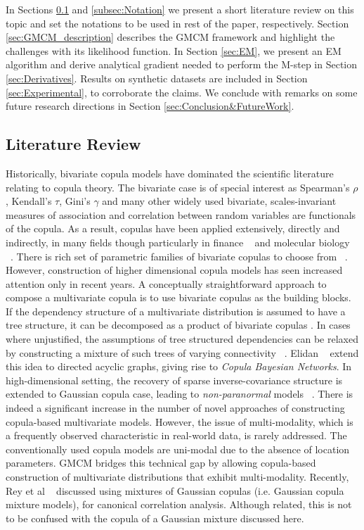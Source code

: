 \documentclass[]{article}
\begin{document}
In Sections \ref{subsec:LitReview} and \ref{subsec:Notation} we present a short literature review on this topic and set the notations to be used in rest of the paper, respectively. Section \ref{sec:GMCM_description} describes the GMCM framework and highlight the challenges with its likelihood function. In Section \ref{sec:EM}, we present an EM algorithm and derive analytical gradient needed to perform the M-step in Section \ref{sec:Derivatives}. Results on synthetic datasets are included in Section \ref{sec:Experimental}, to corroborate the claims. We conclude with remarks on some future research directions in Section \ref{sec:Conclusion&FutureWork}.


\subsection{Literature Review}\label{subsec:LitReview}
Historically, bivariate copula models have dominated the scientific literature relating to copula theory. The bivariate case is of special interest as  Spearman’s  $\rho$, Kendall’s $\tau$, Gini’s $\gamma$ and many other widely used bivariate, scales-invariant measures of association and correlation between random variables are functionals of the copula. As a result, copulas have been applied extensively, directly and indirectly, in many fields though particularly in finance ~\cite{Cherubini2004copula, Hu2006MixedCopulaFinacialMarkets} and molecular biology ~\cite{Bilgrau2015,Li2011,Kim2008,Ma2012Gini}. There is  rich set of parametric families of bivariate copulas to choose from ~\cite{Nelsen1999introduction}. However, construction of higher dimensional copula models has seen increased attention only in recent years. A conceptually straightforward approach to compose a multivariate copula is to use bivariate copulas as the building blocks. If the dependency structure of a multivariate distribution is assumed to have a tree structure, it can be decomposed as a product of bivariate copulas \cite{Bedford2002}. In cases where unjustified, the assumptions of tree structured dependencies can be relaxed by constructing a mixture of such trees of varying connectivity ~\cite{Kurowicka2009Book}. Elidan ~\cite{Elidan2010} extend this idea to directed acyclic graphs,  giving rise to \emph{Copula Bayesian Networks}. In high-dimensional setting, the recovery of sparse inverse-covariance structure is extended to Gaussian copula case, leading to \emph{non-paranormal} models ~\cite{Liu2009}. There is indeed a significant increase in the number of novel approaches of constructing copula-based multivariate models. However, the issue of multi-modality, which is a frequently observed characteristic in real-world data, is rarely addressed. The conventionally used copula models are uni-modal due to the absence of location parameters. GMCM bridges this technical gap by allowing copula-based construction of multivariate distributions that exhibit multi-modality.  Recently, Rey et al ~\cite{Rey2012_CopulaMixture} discussed using mixtures of Gaussian copulas (i.e. Gaussian copula mixture models), for canonical correlation analysis. Although related, this is not to be confused with the copula of a Gaussian mixture discussed here.
\end{document}
